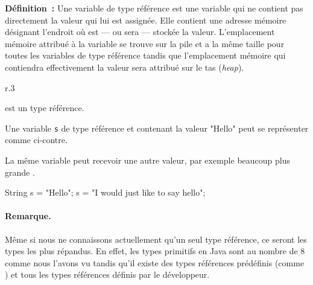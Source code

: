 	\textbf{Définition~:} 
	Une variable de type référence est une variable qui ne contient pas
	directement la valeur qui lui est assignée. Elle contient une adresse
	mémoire désignant l'endroit où est — ou sera — stockée la valeur.
	L'emplacement mémoire attribué à la variable se trouve sur la pile et a la
	même taille pour toutes les variables de type référence tandis que
	l'emplacement mémoire qui contiendra effectivement la valeur sera attribué
	sur le tas (\textit{heap}).


	\begin{wrapfigure}{r}{.3\linewidth}
		\begin{center}
		\end{center}
	\end{wrapfigure}
	
	 est un type référence. 

	Une variable \texttt{s} de type référence et contenant la valeur "Hello" 
	peut se représenter comme ci-contre. 
	

	La même variable  peut recevoir une autre valeur, par exemple beaucoup
	plus grande . 

	\begin{java}
		String s = "Hello";
		s = "I would just like to say hello";
	\end{java}
		
	\begin{center}
	\end{center}
	
	\paragraph{Remarque.} Même si nous ne connaissons actuellement qu'un seul
	type référence, ce seront les types les plus répandus. En effet, les types
	primitifs en Java sont au nombre de 8 comme nous l'avons vu tandis qu'il
	existe des types références prédéfinis (comme ) et tous les types
	références définis par le développeur.  
	
